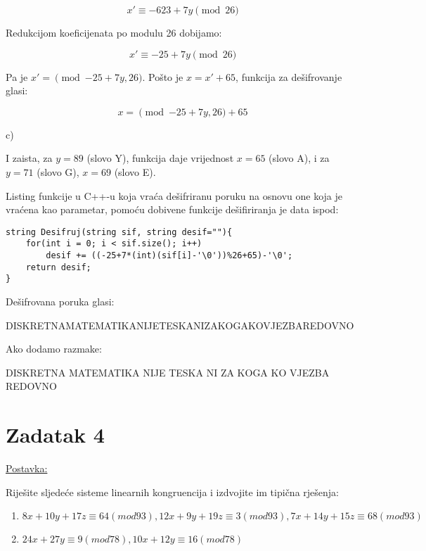 \documentclass[12pt]{article}
\begin{document}
$$x' \equiv -623 + 7y \pmod{26}$$\vspace{1mm}

Redukcijom koeficijenata po modulu 26 dobijamo:

$$x' \equiv -25 + 7y \pmod{26}$$\vspace{1mm}

Pa je $x' = \pmod{-25 + 7y, 26}$. Pošto je $x = x' + 65$, funkcija za dešifrovanje glasi:

$$x = \pmod{-25 + 7y, 26} + 65$$

c)

I zaista, za $y = 89$ (slovo Y), funkcija daje vrijednost $x = 65$ (slovo A), i za $y = 71$ (slovo G), $x = 69$ (slovo E).

Listing funkcije u C++-u koja vraća dešifriranu poruku na osnovu one koja je vraćena kao parametar, pomoću dobivene funkcije dešifiriranja je data ispod:\vspace{5mm}
\begin{lstlisting}
string Desifruj(string sif, string desif=""){
    for(int i = 0; i < sif.size(); i++)
        desif += ((-25+7*(int)(sif[i]-'\0'))%26+65)-'\0';
    return desif;
}
\end{lstlisting}

Dešifrovana poruka glasi:
\begin{center}
DISKRETNAMATEMATIKANIJETESKANIZAKOGAKOVJEZBAREDOVNO
\end{center}

Ako dodamo razmake:

\begin{center}
DISKRETNA MATEMATIKA NIJE TESKA NI ZA KOGA KO VJEZBA REDOVNO
\end{center}

\newpage

\section*{Zadatak 4\label{Z4}}

\underline{Postavka:}

Riješite sljedeće sisteme linearnih kongruencija i izdvojite im tipična rješenja:

\begin{enumerate}
\item $8 x + 10 y + 17 z \equiv 64 (mod 93), 12 x + 9 y + 19 z \equiv 3 (mod 93), 7 x + 14 y + 15 z \equiv 68 (mod 93)$
\item $24 x + 27 y \equiv 9 (mod 78), 10 x + 12 y \equiv 16 (mod 78)$
\end{enumerate}
\end{document}
